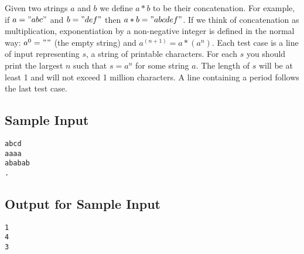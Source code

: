 

Given two strings $a$ and $b$ we define $a*b$ to be their concatenation. For example, if $a = "abc"$ and $b = "def"$ then $a*b = "abcdef"$. If we think of concatenation as multiplication, exponentiation by a non-negative integer is defined in the normal way: $a^0 = ""$ (the empty string) and $a^(n+1) = a*(a^n)$.
Each test case is a line of input representing $s$, a string of printable characters. For each $s$ you should print the largest $n$ such that $s = a^n$ for some string $a$. The length of $s$ will be at least 1 and will not exceed 1 million characters. A line containing a period follows the last test case.

\subsection*{Sample Input}

\begin{verbatim}
abcd
aaaa
ababab
.
\end{verbatim}

\subsection*{Output for Sample Input}

\begin{verbatim}
1
4
3
\end{verbatim}
